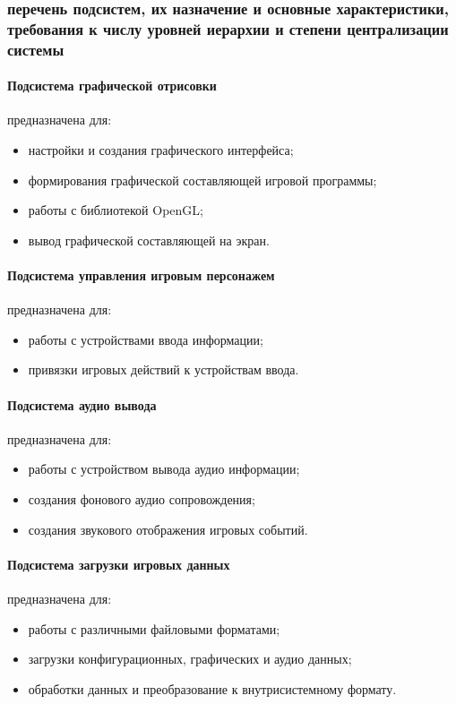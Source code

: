 \subsubsection{перечень подсистем, их назначение и основные характеристики, требования к числу 
    уровней иерархии и степени централизации системы}
\paragraph{Подсистема графической отрисовки}
предназначена для:
\begin{itemize}
    \item настройки и создания графического интерфейса;
    \item формирования графической составляющей игровой программы;
    \item работы с библиотекой OpenGL;
    \item вывод графической составляющей на экран.
\end{itemize}

\paragraph{Подсистема управления игровым персонажем}
предназначена для:
\begin{itemize}
    \item работы с устройствами ввода информации;
    \item привязки игровых действий к устройствам ввода.
\end{itemize}

\paragraph{Подсистема аудио вывода}
предназначена для:
\begin{itemize}
    \item работы с устройством вывода аудио информации;
    \item создания фонового аудио сопровождения;
    \item создания звукового отображения игровых событий.
\end{itemize}

\paragraph{Подсистема загрузки игровых данных}
предназначена для:
\begin{itemize}
    \item работы с различными файловыми форматами;
    \item загрузки конфигурационных, графических и аудио данных;
    \item обработки данных и преобразование к внутрисистемному формату.
\end{itemize}

